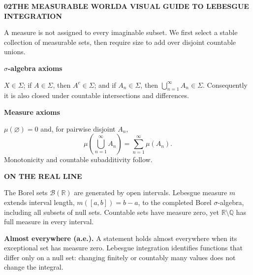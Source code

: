 \documentclass[10pt,a4paper]{article}
\newcommand{\R}{\mathbb R}
\newcommand{\B}{\mathcal B}
\newcommand{\1}{\mathbf 1}
\newcommand{\footertext}{LEBESGUE INTEGRATION}
\newcommand{\pagehead}[3]{{\fontsize{7.2}{8}\selectfont\bfseries\color{teal}#1\quad #2\hfill\normalfont\color{muted}A VISUAL GUIDE TO LEBESGUE INTEGRATION}\par\vspace{2pt}{\color{line}\hrule height .45pt}\vspace{8pt}{\fontsize{22}{24}\selectfont\bfseries\color{navy}#3}\par\vspace{5pt}}
\newcommand{\lead}[1]{{\fontsize{11.2}{15}\selectfont #1\par}\vspace{5pt}}
\newcommand{\eyebrow}[1]{{\fontsize{7}{8}\selectfont\bfseries\color{teal}\MakeUppercase{#1}}}
\begin{document}
\renewcommand{\footertext}{SIGMA-ALGEBRAS / MEASURES / NULL SETS}
\pagehead{02}{THE MEASURABLE WORLD}{Which sets may receive a size?}
\lead{A measure is not assigned to every imaginable subset. We first select a stable collection of measurable sets, then require size to add over disjoint countable unions.}
\begin{center}
\end{center}
\begin{minipage}[t]{.48\textwidth}
\begin{mathbox}\textbf{$\sigma$-algebra axioms}\par
$X\in\Sigma$; if $A\in\Sigma$, then $A^c\in\Sigma$; and if $A_n\in\Sigma$, then $\bigcup_{n=1}^{\infty}A_n\in\Sigma$. Consequently it is also closed under countable intersections and differences.\end{mathbox}
\end{minipage}\hfill
\begin{minipage}[t]{.48\textwidth}
\begin{tealbox}\textbf{Measure axioms}\par
$\mu(\varnothing)=0$ and, for pairwise disjoint $A_n$,
\[\mu\!\left(\bigcup_{n=1}^\infty A_n\right)=\sum_{n=1}^\infty\mu(A_n).\]
Monotonicity and countable subadditivity follow.\end{tealbox}
\end{minipage}
\vspace{6pt}
\begin{goldbox}\eyebrow{On the real line}\par
The Borel sets $\B(\R)$ are generated by open intervals. Lebesgue measure $m$ extends interval length, $m([a,b])=b-a$, to the completed Borel $\sigma$-algebra, including all subsets of null sets. Countable sets have measure zero, yet $\R\setminus\mathbb Q$ has full measure in every interval.\end{goldbox}
\begin{coralbox}\textbf{Almost everywhere (a.e.).} A statement holds almost everywhere when its exceptional set has measure zero. Lebesgue integration identifies functions that differ only on a null set: changing finitely or countably many values does not change the integral.\end{coralbox}
\newpage
\end{document}
